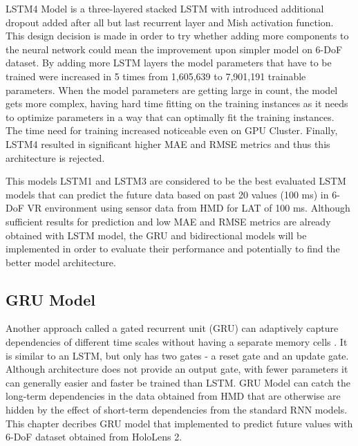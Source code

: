 LSTM4 Model is a three-layered stacked LSTM with introduced additional dropout  added after all but last recurrent layer and Mish activation function. This design decision is made in order to try whether adding more components to the neural network could mean the improvement upon simpler model on 6-DoF dataset. By adding more LSTM layers the model parameters that have to be trained were increased in 5 times from 1,605,639 to 7,901,191 trainable parameters. When the model parameters are getting large in count, the model gets more complex, having hard time fitting on the training instances as it needs to optimize parameters in a way that can optimally fit the training instances. The time need for training increased noticeable even on GPU Cluster. Finally, LSTM4 resulted in significant higher MAE and RMSE metrics and thus this architecture is rejected.  

This models LSTM1 and LSTM3 are considered to be the best evaluated LSTM models that can predict the future data based on past 20 values (100 ms) in 6-DoF VR environment using sensor data from HMD for LAT of 100 ms. Although sufficient results for prediction and low MAE and RMSE metrics are already obtained with LSTM model, the GRU and bidirectional models will be implemented in order to evaluate their performance and potentially to find the better model architecture. 

\subsection{GRU Model}
\label{sec:impl:model:arch:gru}
Another approach called a gated recurrent unit (GRU) can adaptively capture dependencies of different time scales without having a separate memory cells \cite{empirical_evaluation}. It is similar to an LSTM, but only has two gates - a reset gate and an update gate. Although architecture does not provide an output gate, with fewer parameters it can generally easier and faster be trained than LSTM.  GRU Model can catch the long-term dependencies in the data obtained from HMD that are otherwise are hidden by the effect of short-term dependencies from the standard RNN models. This chapter decribes GRU model that implemented to predict future values with 6-DoF dataset obtained from HoloLens 2. \\

